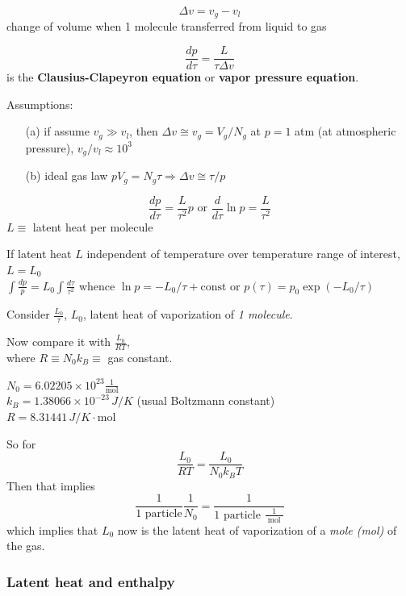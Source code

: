 \documentclass[twoside]{amsart}
\theoremstyle{plain}
\theoremstyle{definition}
\begin{document}
\begin{equation}
  \Delta v = v_g - v_l
\end{equation}
change of volume when 1 molecule transferred from liquid to gas

\begin{equation}
  \frac{dp}{d \tau} = \frac{ L }{ \tau \Delta v}
\end{equation}
is the \textbf{ Clausius-Clapeyron equation} or \textbf{vapor pressure equation}.  

Assumptions:
\begin{enumerate}
  \item[(a)] if assume $v_g \gg v_l$, then $\Delta v \cong v_g = V_g/N_g$ at $p=1$ atm (at atmospheric pressure), $v_g/v_l \approx 10^3$
  \item[(b)] ideal gas law $pV_g = N_g \tau \Longrightarrow \Delta v \cong \tau/p$
\end{enumerate}
\[
\frac{dp}{d\tau} = \frac{L}{\tau^2}p \text{ or } \frac{d}{d\tau} \ln{p} = \frac{L}{\tau^2}
\]
$L \equiv $ latent heat per molecule

If latent heat $L$ independent of temperature over temperature range of interest, $L = L_0$ \\
\phantom{\quad \, } $\int \frac{dp}{p} = L_0 \int \frac{d\tau}{\tau^2}$ whence $\ln{p} = -L_0/\tau + \text{const}$ or $p(\tau) = p_0\exp{ (-L_0/\tau)}$



Consider $\frac{L_0}{\tau}$, $L_0$, latent heat of vaporization of \emph{1 molecule}.  

Now compare it with $\frac{L_0}{RT}$, \\
where $R \equiv N_0 k_B \equiv $ gas constant.  

$N_0 = 6.02205 \times 10^{23} \frac{1}{ \text{mol}}$ \\
$k_B = 1.38066 \times 10^{-23} \, J/K$ (usual Boltzmann constant) \\
$R = 8.31441 \, J/K\cdot \text{mol}$ 

So for 
\[
\frac{L_0}{RT} = \frac{L_0}{N_0 k_B T}
\]
Then that implies
\[
\frac{1}{ 1 \text{ particle} } \frac{1}{N_0} = \frac{1}{ 1 \text{ particle } \frac{1}{ \text{ mol }} }
\]
which implies that $L_0$ now is the latent heat of vaporization of a \emph{mole (mol)} of the gas.  



\subsubsection*{Latent heat and enthalpy}
\end{document}
